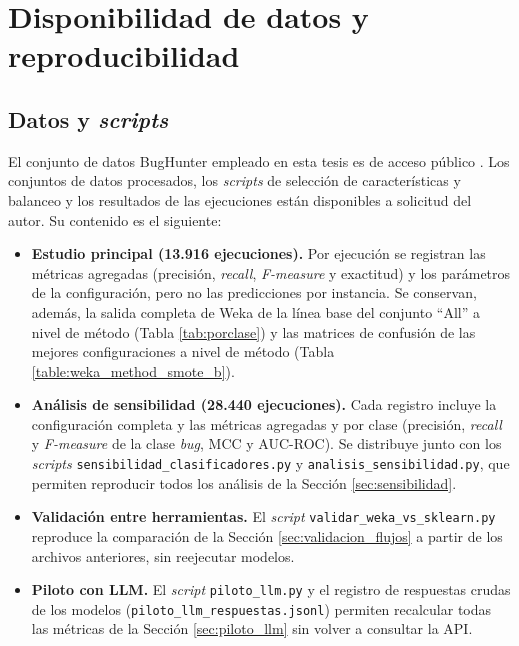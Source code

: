 \fontsize{12pt}{14.5}\selectfont
\chapter{Disponibilidad de datos y reproducibilidad} \label{anexo1}

\section{Datos y \textit{scripts}}

El conjunto de datos BugHunter empleado en esta tesis es de acceso público \cite{ferenc_automatically_2020}. Los conjuntos de datos procesados, los \textit{scripts} de selección de características y balanceo y los resultados de las ejecuciones están disponibles a solicitud del autor. Su contenido es el siguiente:

\begin{itemize}
    \item \textbf{Estudio principal (13.916 ejecuciones).} Por ejecución se registran las métricas agregadas (precisión, \textit{recall}, \textit{F-measure} y exactitud) y los parámetros de la configuración, pero no las predicciones por instancia. Se conservan, además, la salida completa de Weka de la línea base del conjunto ``All'' a nivel de método (Tabla \ref{tab:porclase}) y las matrices de confusión de las mejores configuraciones a nivel de método (Tabla \ref{table:weka_method_smote_b}).
    \item \textbf{Análisis de sensibilidad (28.440 ejecuciones).} Cada registro incluye la configuración completa y las métricas agregadas y por clase (precisión, \textit{recall} y \textit{F-measure} de la clase \textit{bug}, MCC y AUC-ROC). Se distribuye junto con los \textit{scripts} \texttt{sensibilidad\_clasificadores.py} y \texttt{analisis\_sensibilidad.py}, que permiten reproducir todos los análisis de la Sección \ref{sec:sensibilidad}.
    \item \textbf{Validación entre herramientas.} El \textit{script} \texttt{validar\_weka\_vs\_sklearn.py} reproduce la comparación de la Sección \ref{sec:validacion_flujos} a partir de los archivos anteriores, sin reejecutar modelos.
    \item \textbf{Piloto con LLM.} El \textit{script} \texttt{piloto\_llm.py} y el registro de respuestas crudas de los modelos (\texttt{piloto\_llm\_respuestas.jsonl}) permiten recalcular todas las métricas de la Sección \ref{sec:piloto_llm} sin volver a consultar la API.
\end{itemize}

